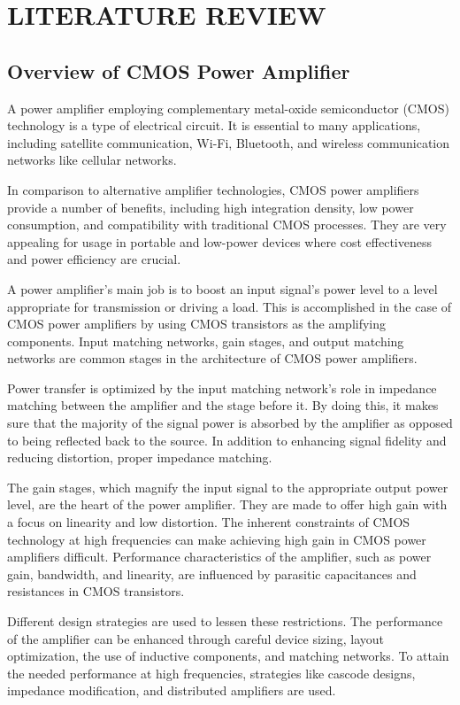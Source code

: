 \chapter{LITERATURE REVIEW}
\section{Overview of CMOS Power Amplifier}
A power amplifier employing complementary metal-oxide semiconductor (CMOS) technology is a type of electrical circuit. It is essential to many applications, including satellite communication, Wi-Fi, Bluetooth, and wireless communication networks like cellular networks.

In comparison to alternative amplifier technologies, CMOS power amplifiers provide a number of benefits, including high integration density, low power consumption, and compatibility with traditional CMOS processes. They are very appealing for usage in portable and low-power devices where cost effectiveness and power efficiency are crucial.

A power amplifier's main job is to boost an input signal's power level to a level appropriate for transmission or driving a load. This is accomplished in the case of CMOS power amplifiers by using CMOS transistors as the amplifying components. Input matching networks, gain stages, and output matching networks are common stages in the architecture of CMOS power amplifiers.

Power transfer is optimized by the input matching network's role in impedance matching between the amplifier and the stage before it. By doing this, it makes sure that the majority of the signal power is absorbed by the amplifier as opposed to being reflected back to the source. In addition to enhancing signal fidelity and reducing distortion, proper impedance matching.

The gain stages, which magnify the input signal to the appropriate output power level, are the heart of the power amplifier. They are made to offer high gain with a focus on linearity and low distortion. The inherent constraints of CMOS technology at high frequencies can make achieving high gain in CMOS power amplifiers difficult. Performance characteristics of the amplifier, such as power gain, bandwidth, and linearity, are influenced by parasitic capacitances and resistances in CMOS transistors.

Different design strategies are used to lessen these restrictions. The performance of the amplifier can be enhanced through careful device sizing, layout optimization, the use of inductive components, and matching networks. To attain the needed performance at high frequencies, strategies like cascode designs, impedance modification, and distributed amplifiers are used.

